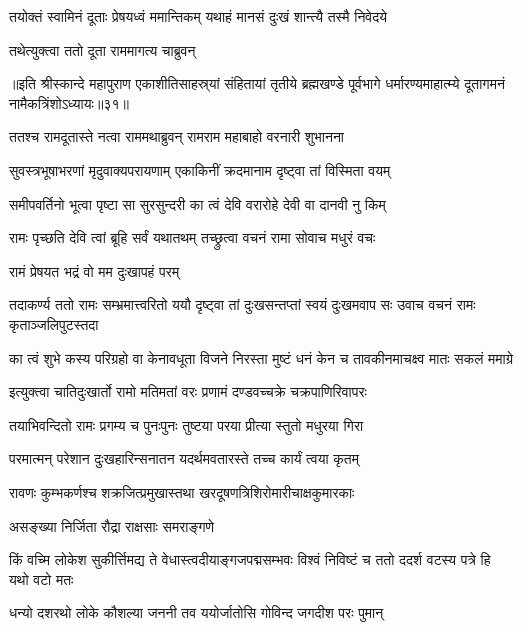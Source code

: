 \twolineshloka
{तयोक्तं स्वामिनं दूताः प्रेषयध्वं ममान्तिकम्}
{यथाहं मानसं दुःखं शान्त्यै तस्मै निवेदये}%

\onelineshloka
{तथेत्युक्त्वा ततो दूता राममागत्य चाब्रुवन्}%

॥इति श्रीस्कान्दे महापुराण एकाशीतिसाहस्र्यां संहितायां तृतीये ब्रह्मखण्डे पूर्वभागे धर्मारण्यमाहात्म्ये दूतागमनं नामैकत्रिंशोऽध्यायः॥३१॥

\resetShloka


\twolineshloka
{ततश्च रामदूतास्ते नत्वा राममथाब्रुवन्}
{रामराम महाबाहो वरनारी शुभानना}%

\twolineshloka
{सुवस्त्रभूषाभरणां मृदुवाक्यपरायणाम्}
{एकाकिनीं क्रदमानाम दृष्ट्वा तां विस्मिता वयम्}%

\twolineshloka
{समीपवर्तिनो भूत्वा पृष्टा सा सुरसुन्दरी}
{का त्वं देवि वरारोहे देवी वा दानवी नु किम्}%

\twolineshloka
{रामः पृच्छति देवि त्वां ब्रूहि सर्वं यथातथम्}
{तच्छ्रुत्वा वचनं रामा सोवाच मधुरं वचः}%

\onelineshloka
{रामं प्रेषयत भद्रं वो मम दुःखापहं परम्}%

\threelineshloka
{तदाकर्ण्य ततो रामः सम्भ्रमात्त्वरितो ययौ}
{दृष्ट्वा तां दुःखसन्तप्तां स्वयं दुःखमवाप सः}
{उवाच वचनं रामः कृताञ्जलिपुटस्तदा}%


\twolineshloka
{का त्वं शुभे कस्य परिग्रहो वा केनावधूता विजने निरस्ता}
{मुष्टं धनं केन च तावकीनमाचक्ष्व मातः सकलं ममाग्रे}%

\twolineshloka
{इत्युक्त्वा चातिदुःखार्तो रामो मतिमतां वरः}
{प्रणामं दण्डवच्चक्रे चक्रपाणिरिवापरः} %

\twolineshloka
{तयाभिवन्दितो रामः प्रगम्य च पुनःपुनः}
{तुष्टया परया प्रीत्या स्तुतो मधुरया गिरा}%

\twolineshloka
{परमात्मन् परेशान दुःखहारिन्सनातन}
{यदर्थमवतारस्ते तच्च कार्यं त्वया कृतम्}%

\twolineshloka
{रावणः कुम्भकर्णश्च शक्रजित्प्रमुखास्तथा}
{खरदूषणत्रिशिरोमारीचाक्षकुमारकाः}%

\onelineshloka
{असङ्ख्या निर्जिता रौद्रा राक्षसाः समराङ्गणे}%

\twolineshloka
{किं वच्मि लोकेश सुकीर्त्तिमद्य ते वेधास्त्वदीयाङ्गजपद्मसम्भवः}
{विश्वं निविष्टं च ततो ददर्श वटस्य पत्रे हि यथो वटो मतः}%

\twolineshloka
{धन्यो दशरथो लोके कौशल्या जननी तव}
{ययोर्जातोसि गोविन्द जगदीश परः पुमान्}%

